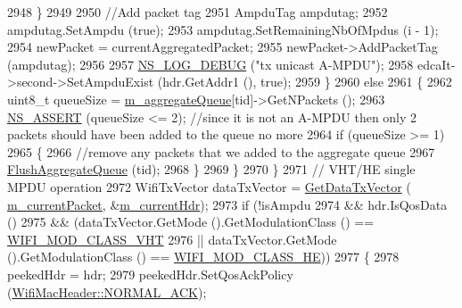 \begin{DoxyCode}
2948                     \}
2949 
2950                   \textcolor{comment}{//Add packet tag}
2951                   AmpduTag ampdutag;
2952                   ampdutag.SetAmpdu (\textcolor{keyword}{true});
2953                   ampdutag.SetRemainingNbOfMpdus (i - 1);
2954                   newPacket = currentAggregatedPacket;
2955                   newPacket->AddPacketTag (ampdutag);
2956 
2957                   \hyperlink{group__logging_ga413f1886406d49f59a6a0a89b77b4d0a}{NS\_LOG\_DEBUG} (\textcolor{stringliteral}{"tx unicast A-MPDU"});
2958                   edcaIt->second->SetAmpduExist (hdr.GetAddr1 (), \textcolor{keyword}{true});
2959                 \}
2960               \textcolor{keywordflow}{else}
2961                 \{
2962                   uint8\_t queueSize = \hyperlink{classns3_1_1MacLow_a50ea30f5dff00a3ef2683b9275717c6f}{m\_aggregateQueue}[tid]->GetNPackets ();
2963                   \hyperlink{assert_8h_a6dccdb0de9b252f60088ce281c49d052}{NS\_ASSERT} (queueSize <= 2); \textcolor{comment}{//since it is not an A-MPDU then only 2 packets
       should have been added to the queue no more}
2964                   \textcolor{keywordflow}{if} (queueSize >= 1)
2965                     \{
2966                       \textcolor{comment}{//remove any packets that we added to the aggregate queue}
2967                       \hyperlink{classns3_1_1MacLow_ab143d3691846b2638a6f089c96169ee2}{FlushAggregateQueue} (tid);
2968                     \}
2969                 \}
2970             \}
2971           \textcolor{comment}{// VHT/HE single MPDU operation}
2972           WifiTxVector dataTxVector = \hyperlink{classns3_1_1MacLow_a04bad04eade9ff1de0940b01c5bcf514}{GetDataTxVector} (
      \hyperlink{classns3_1_1MacLow_aa4f81bb523ceed1bbf5a84851b25e29c}{m\_currentPacket}, &\hyperlink{classns3_1_1MacLow_aec9902bc8026338baf261d2de8fcd83b}{m\_currentHdr});
2973           \textcolor{keywordflow}{if} (!isAmpdu
2974               && hdr.IsQosData ()
2975               && (dataTxVector.GetMode ().GetModulationClass () == 
      \hyperlink{namespacens3_aa999e1221606a2b21b1eb33c2007c217a9863e4342bf5c238c74dddfc4d96c67e}{WIFI\_MOD\_CLASS\_VHT}
2976                   || dataTxVector.GetMode ().GetModulationClass () == 
      \hyperlink{namespacens3_aa999e1221606a2b21b1eb33c2007c217abfa4f7272510045a9b43e8ac27ac13b0}{WIFI\_MOD\_CLASS\_HE}))
2977             \{
2978               peekedHdr = hdr;
2979               peekedHdr.SetQosAckPolicy (\hyperlink{classns3_1_1WifiMacHeader_ae3a382482f357972019f5e1b3162adc4a9f52b9c6ca65d046ce2be9d70bce28cf}{WifiMacHeader::NORMAL\_ACK});

\end{DoxyCode}
